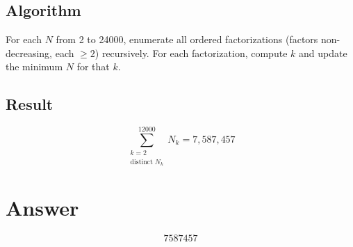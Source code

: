 \documentclass[12pt,a4paper]{article}
\theoremstyle{definition}
\begin{document}
\subsection{Algorithm}
For each $N$ from 2 to 24000, enumerate all ordered factorizations (factors non-decreasing, each $\ge 2$) recursively. For each factorization, compute $k$ and update the minimum $N$ for that $k$.

\subsection{Result}
\[
\sum_{\substack{k=2 \\ \text{distinct } N_k}}^{12000} N_k = \boxed{7{,}587{,}457}
\]

\section{Answer}

\[
\boxed{7587457}
\]
\end{document}
